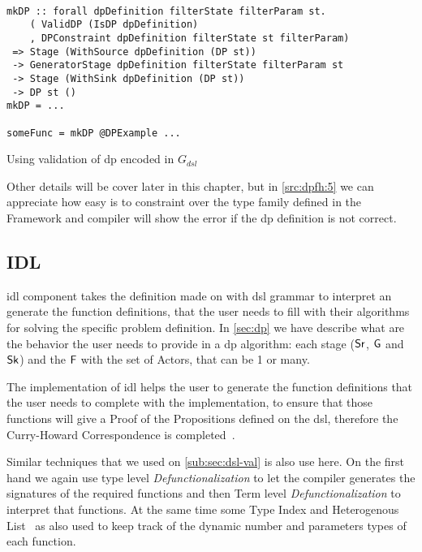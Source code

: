 \begin{listing}[H]
  \begin{verbatim}

mkDP :: forall dpDefinition filterState filterParam st.
    ( ValidDP (IsDP dpDefinition)
    , DPConstraint dpDefinition filterState st filterParam)
 => Stage (WithSource dpDefinition (DP st)) 
 -> GeneratorStage dpDefinition filterState filterParam st  
 -> Stage (WithSink dpDefinition (DP st))  
 -> DP st ()
mkDP = ...

someFunc = mkDP @DPExample ...

  \end{verbatim}
  \caption{Using validation of \acrshort{dp} encoded in $G_{dsl}$}
  \label{src:dpfh:5}
\end{listing}

Other details will be cover later in this chapter, but in \autoref{src:dpfh:5} we can appreciate how easy is to constraint over 
the type family defined in the Framework and compiler will show the error if the \acrshort{dp} definition is not correct.

\subsection{IDL}
\acrfull{idl} component takes the definition made on with \acrshort{dsl} grammar to interpret an generate the function definitions, 
that the user needs to fill with their algorithms for solving the specific problem definition. In \autoref{sec:dp} we have describe what are 
the behavior the user needs to provide in a \acrshort{dp} algorithm: each stage ($\mathsf{Sr}$, $\mathsf{G}$ and $\mathsf{Sk}$) and the $\mathsf{F}$ with the set of Actors, 
that can be 1 or many.

The implementation of \acrshort{idl} helps the user to generate the function definitions that the user needs to complete with the implementation, 
to ensure that those functions will give a Proof of the Propositions defined on the \acrshort{dsl}, therefore the Curry-Howard Correspondence is completed~\cite{curryhoward}.

Similar techniques that we used on \autoref{sub:sec:dsl-val} is also use here. On the first hand we again use type level \emph{Defunctionalization} to 
let the compiler generates the signatures of the required functions and then Term level \emph{Defunctionalization} to interpret that functions.
At the same time some Type Index and Heterogenous List~\cite{type-index} as also used to keep track of the dynamic number and parameters types of each 
function. 

